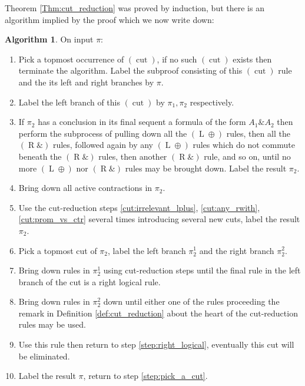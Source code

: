 \documentclass[12pt]{article}
\theoremstyle{plain}
\theoremstyle{definition}
\newtheorem{algorithm}[thm]{Algorithm}
\newcommand{\rwith}{(\operatorname{R}\&)}
\newcommand{\lplus}{(\operatorname{L}\oplus)}
\newcommand{\cut}{(\operatorname{cut})}
\begin{document}
Theorem \ref{Thm:cut_reduction} was proved by induction, but there is an algorithm implied by the proof which we now write down:
\begin{algorithm}
On input $\pi$:
\begin{enumerate}
    \item\label{step:pick_a_cut} Pick a topmost occurrence of $\cut$, if no such $\cut$ exists then terminate the algorithm. Label the subproof consisting of this $\cut$ rule and the its left and right branches by $\pi$.
    \item Label the left branch of this $\cut$ by $\pi_1, \pi_2$ respectively.
    \item If $\pi_2$ has a conclusion in its final sequent a formula of the form $A_1 \& A_2$ then perform the subprocess of pulling down all the $\lplus$ rules, then all the $\rwith$ rules, followed again by any $\lplus$ rules which do not commute beneath the $\rwith$ rules, then another $\rwith$ rule, and so on, until no more $\lplus$ nor $\rwith$ rules may be brought down. Label the result $\pi_2$.
    \item Bring down all active contractions in $\pi_2$.
    \item Use the cut-reduction steps \ref{cut:irrelevant_lplus}, \ref{cut:any_rwith}, \ref{cut:prom_vs_ctr} several times introducing several new cuts, label the result $\pi_2$.
    \item Pick a topmost cut of $\pi_2$, label the left branch $\pi_2^1$ and the right branch $\pi_2^2$.
    \item\label{step:right_logical} Bring down rules in $\pi_2^1$ using cut-reduction steps until the final rule in the left branch of the cut is a right logical rule.
    \item Bring down rules in $\pi_2^2$ down until either one of the rules proceeding the remark in Definition \ref{def:cut_reduction} about the heart of the cut-reduction rules may be used.
    \item Use this rule then return to step \eqref{step:right_logical}, eventually this cut will be eliminated.
    \item Label the result $\pi$, return to step \eqref{step:pick_a_cut}.
\end{enumerate}
\end{algorithm}

\providecommand{\bysame}{\leavevmode\hbox to3em{\hrulefill}\thinspace}
\providecommand{\href}[2]{#2}
\end{document}
